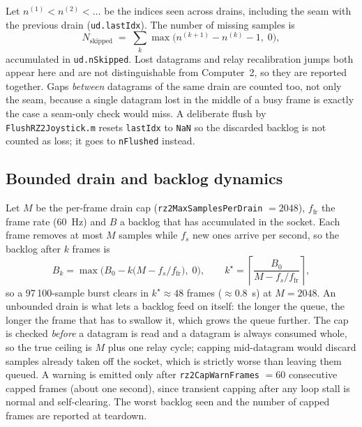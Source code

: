 \documentclass[11pt,a4paper]{article}
\newcommand{\code}[1]{\texttt{\small #1}}
\newcommand{\file}[1]{\texttt{\small #1}}
\begin{document}
Let $n^{(1)} < n^{(2)} < \dots$ be the indices seen across drains, including the
seam with the previous drain (\code{ud.lastIdx}). The number of missing samples
is
\begin{equation}
  N_{\text{skipped}} \;=\; \sum_k \max\!\big(n^{(k+1)} - n^{(k)} - 1,\; 0\big),
  \label{eq:skipped}
\end{equation}
accumulated in \code{ud.nSkipped}. Lost datagrams and relay recalibration jumps
both appear here and are not distinguishable from Computer~2, so they are
reported together. Gaps \emph{between} datagrams of the same drain are counted
too, not only the seam, because a single datagram lost in the middle of a busy
frame is exactly the case a seam-only check would miss. A deliberate flush by
\file{FlushRZ2Joystick.m} resets \code{lastIdx} to \code{NaN} so the discarded
backlog is not counted as loss; it goes to \code{nFlushed} instead.

\subsection{Bounded drain and backlog dynamics}
\label{sec:drain}

Let $M$ be the per-frame drain cap (\code{rz2MaxSamplesPerDrain} $= 2048$),
$f_{\text{fr}}$ the frame rate (60~Hz) and $B$ a backlog that has accumulated in
the socket. Each frame removes at most $M$ samples while $f_s$ new ones arrive
per second, so the backlog after $k$ frames is
\begin{equation}
  B_k = \max\!\Big(B_0 - k\big(M - f_s/f_{\text{fr}}\big),\; 0\Big),
  \qquad
  k^{\star} = \left\lceil \frac{B_0}{M - f_s/f_{\text{fr}}} \right\rceil,
  \label{eq:backlog}
\end{equation}
so a 97\,100-sample burst clears in $k^\star \approx 48$ frames
($\approx 0.8$~s) at $M = 2048$. An unbounded drain is what lets a backlog feed
on itself: the longer the queue, the longer the frame that has to swallow it,
which grows the queue further. The cap is checked \emph{before} a datagram is
read and a datagram is always consumed whole, so the true ceiling is $M$ plus
one relay cycle; capping mid-datagram would discard samples already taken off
the socket, which is strictly worse than leaving them queued. A warning is
emitted only after \code{rz2CapWarnFrames} $= 60$ consecutive capped frames
(about one second), since transient capping after any loop stall is normal and
self-clearing. The worst backlog seen and the number of capped frames are
reported at teardown.
\end{document}
